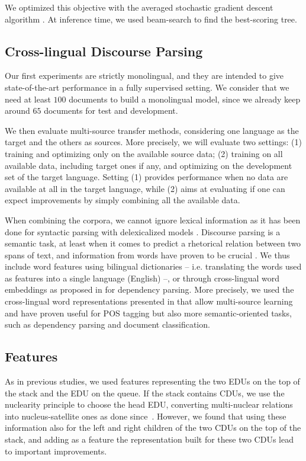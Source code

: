 \documentclass[11pt]{article}
\begin{document}
We optimized this objective with the averaged stochastic gradient descent algorithm \cite{polyak-1992}.
At inference time, we used beam-search to find the best-scoring tree.


\subsection{Cross-lingual Discourse Parsing}
\label{subsec:cross}

Our first experiments are strictly monolingual, and they are intended to give state-of-the-art performance in a fully supervised setting.
We consider that we need at least $100$ documents to build a monolingual model, since we already keep around $65$ documents for test and development.

We then evaluate multi-source transfer methods, considering one language as the target and the others as sources.
More precisely, we will evaluate two settings: (1) training and optimizing only on the available source data; (2) training on all available data, including target ones if any, and optimizing on the development set of the target language. Setting (1) provides performance when no data are available at all in the target language, while (2) aims at evaluating if one can expect improvements by simply combining all the available data.

When combining the corpora, we cannot ignore lexical information as it has been done for syntactic parsing with delexicalized models \cite{mcdonald:multi:2011}.
Discourse parsing is a semantic task, at least when it comes to predict a rhetorical relation between two spans of text, and information from words have proven to be crucial \cite{rutherford:discovering:2014,braud:comparing:2015}.
We thus include word features using bilingual dictionaries -- i.e. translating the words used as features into a single language (English) --, or through cross-lingual word embeddings as proposed in \cite{guo:cross:2015} for dependency parsing. 
More precisely, we used the cross-lingual word representations presented in \cite{levy:strong:2017} that allow multi-source learning and have proven useful for POS tagging but also more semantic-oriented tasks, such as dependency parsing and document classification.

\subsection{Features}
\label{sec:features}

As in previous studies, we used features representing the two EDUs on the top of the stack and the EDU on the queue. If the stack contains CDUs, we use the nuclearity principle to choose the head EDU, converting multi-nuclear relations into nucleus-satellite ones as done since~\cite{sagae:analysis:2009}. 
However, we found that using these information also for the left and right children of the two CDUs on the top of the stack, and adding as a feature the representation built for these two CDUs lead to important improvements.
\end{document}
